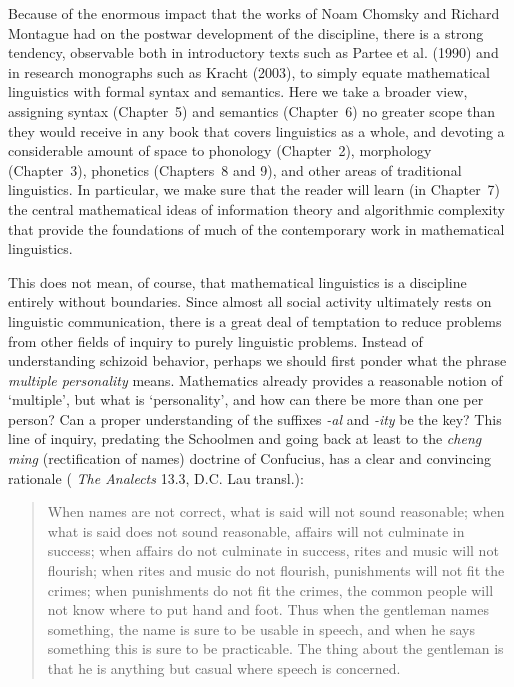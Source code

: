 Because of the enormous impact that the works of Noam Chomsky and Richard
Montague had on the postwar development of the discipline, there is a strong
tendency, observable both in introductory texts such as Partee et al. (1990)
and in research monographs such as Kracht (2003), to simply equate
mathematical linguistics with formal syntax and semantics. Here we take a
broader view, assigning syntax (Chapter~5) and semantics (Chapter~6) no
greater scope than they would receive in any book that covers linguistics as a
whole, and devoting a considerable amount of space to phonology (Chapter~2),
morphology (Chapter~3), phonetics (Chapters~8 and 9), and other areas of
traditional linguistics. In particular, we make sure that the reader will
learn (in Chapter~7) the central mathematical ideas of information theory and
algorithmic complexity that provide the foundations of much of the
contemporary work in mathematical linguistics.\nocite{Partee:1990}

This does not mean, of course, that mathematical linguistics is a discipline
entirely without boundaries.  Since almost all social activity ultimately
rests on linguistic communication, there is a great deal of temptation to
reduce problems from other fields of inquiry to purely linguistic problems.
Instead of understanding schizoid behavior, perhaps we should first ponder
what the phrase {\it multiple personality} means.  Mathematics already
provides a reasonable notion of `multiple', but what is `personality', and how
can there be more than one per person? Can a proper understanding of the
suffixes {\it -al} and {\it -ity} be the key?  This line of inquiry, predating
the Schoolmen and going back at least to the {\sl cheng ming} (rectification
of names) doctrine of Confucius, has a clear and convincing rationale ({\it
  The Analects} 13.3, D.C. Lau transl.): 
\nocite{Confucius:1979}

\begin{quote}
When names are not correct, what is said will not sound reasonable; when 
what is said does not sound reasonable, affairs will not culminate in 
success; when affairs do not culminate in success, rites and music will 
not flourish; when rites and music do not flourish, punishments will not 
fit the crimes; when punishments do not fit the crimes, the common 
people will not know where to put hand and foot. Thus when the gentleman
names something, the name is sure to be usable in speech, and when he says 
something this is sure to be practicable. The thing about the gentleman is
that he is anything but casual where speech is concerned.
\end{quote}

